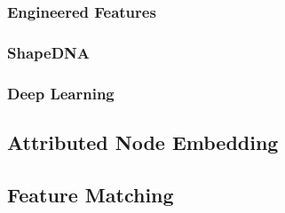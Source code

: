 \subsubsection{Engineered Features}
\subsubsection{ShapeDNA}
\subsubsection{Deep Learning}

\subsection{Attributed Node Embedding}
\subsection{Feature Matching}